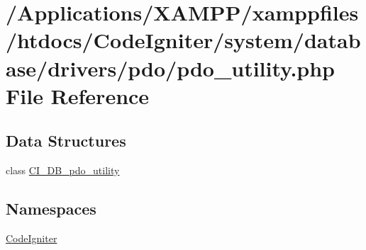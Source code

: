 \hypertarget{pdo__utility_8php}{}\section{/\+Applications/\+X\+A\+M\+P\+P/xamppfiles/htdocs/\+Code\+Igniter/system/database/drivers/pdo/pdo\+\_\+utility.php File Reference}
\label{pdo__utility_8php}
\subsection*{Data Structures}
\begin{DoxyCompactItemize}
\item 
class \mbox{\hyperlink{class_c_i___d_b__pdo__utility}{C\+I\+\_\+\+D\+B\+\_\+pdo\+\_\+utility}}
\end{DoxyCompactItemize}
\subsection*{Namespaces}
\begin{DoxyCompactItemize}
\item 
 \mbox{\hyperlink{namespace_code_igniter}{Code\+Igniter}}
\end{DoxyCompactItemize}
